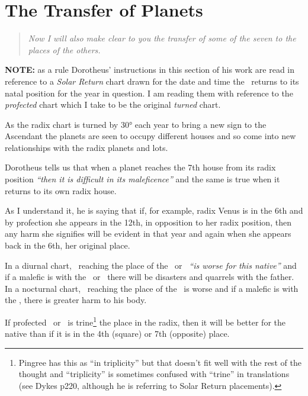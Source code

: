 \section{The Transfer of Planets }
\begin{quote}
\textsl{Now I will also make clear to you the transfer of some of the seven to the places of the others.}
\end{quote}

\begin{mdframed}[backgroundcolor=cyan!5, rightmargin=1em, leftmargin=1em]
\textbf{NOTE:} as a rule Dorotheus' instructions in this section of his work are read in reference to a \textsl{Solar Return} chart drawn for the date and time the \Sun\, returns to its natal position for the year in question. I am reading them with reference to the \textsl{profected} chart which I take to be the original \textsl{turned} chart.

As the radix chart is turned by 30° each year to bring a new sign to the Ascendant the planets are seen to occupy different houses and so come into new relationships with the radix planets and lots.
\end{mdframed}

Dorotheus  tells us that when a planet reaches the 7th house from its radix position \textsl{``then it is difficult in its maleficence''} and the same is true when it returns to its own radix house. 

\begin{mdframed}[backgroundcolor=cyan!5, rightmargin=1em, leftmargin=1em]
As I understand it, he is saying that if, for example, radix Venus is in the 6th and by profection she appears in the 12th, in opposition to her radix position, then any harm she signifies will be evident in that year and again when she appears back in the 6th, her original place.
\end{mdframed}

In  a diurnal chart, \Mars\, reaching the place of the \Sun\, or \Jupiter\, \textsl{``is worse for this native''} and if a malefic is with the \Sun\, or \Jupiter\, there will be disasters and quarrels with the father. In a nocturnal chart, \Saturn\, reaching the place of the \Moon\, is worse and if a malefic is with the \Moon, there is greater harm to his body.

If  profected \Saturn\, or \Mars\, is trine\footnote{Pingree has this as ``in triplicity'' but that doesn't fit well with the rest of the thought and ``triplicity'' is sometimes confused with ``trine'' in translations (see Dykes p220, although he is referring to Solar Return placements).} the place in the radix, then it will be better for the native than if it is in the 4th (square) or 7th (opposite) place.

